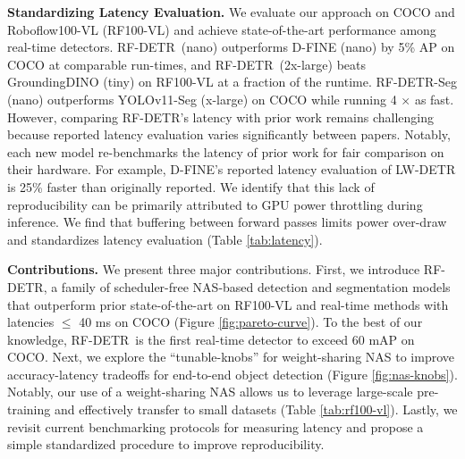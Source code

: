 \documentclass{article} %
\newcommand{\method}{RF-DETR}
\begin{document}
\textbf{Standardizing Latency Evaluation.} We evaluate our approach on COCO \citep{lin2014coco} and Roboflow100-VL (RF100-VL) \citep{robicheaux2025roboflow100vl} and achieve state-of-the-art performance among real-time detectors. \method \ (nano) outperforms D-FINE (nano) by 5\% AP on COCO at comparable run-times, and \method \ (2x-large) beats GroundingDINO (tiny) on RF100-VL at a fraction of the runtime. \method-Seg (nano) outperforms YOLOv11-Seg (x-large) on COCO while running 4 $\times$ as fast. However, comparing \method's latency with prior work remains challenging because reported latency evaluation varies significantly between papers. Notably, each new model re-benchmarks the latency of prior work for fair comparison on their hardware. For example, D-FINE's reported latency evaluation of LW-DETR \citep{chen2024lw} is 25\% faster than originally reported. We identify that this lack of reproducibility can be primarily attributed to GPU power throttling during inference. We find that buffering between forward passes limits power over-draw and standardizes latency evaluation (Table \ref{tab:latency}).

\textbf{Contributions.} We present three major contributions. First, we introduce \method, a family of scheduler-free NAS-based detection and segmentation models that outperform prior state-of-the-art on RF100-VL \citep{robicheaux2025roboflow100vl} and real-time methods with latencies $\leq$ 40 ms on COCO \citep{lin2014coco} (Figure \ref{fig:pareto-curve}). To the best of our knowledge, \method \ is the first real-time detector to exceed 60 mAP on COCO. Next, we explore the ``tunable-knobs'' for weight-sharing NAS to improve accuracy-latency tradeoffs for end-to-end object detection (Figure \ref{fig:nas-knobs}). Notably, our use of a weight-sharing NAS allows us to leverage large-scale pre-training and effectively transfer to small datasets (Table \ref{tab:rf100-vl}). Lastly, we revisit current benchmarking protocols for measuring latency and propose a simple standardized procedure to improve reproducibility.
\end{document}
